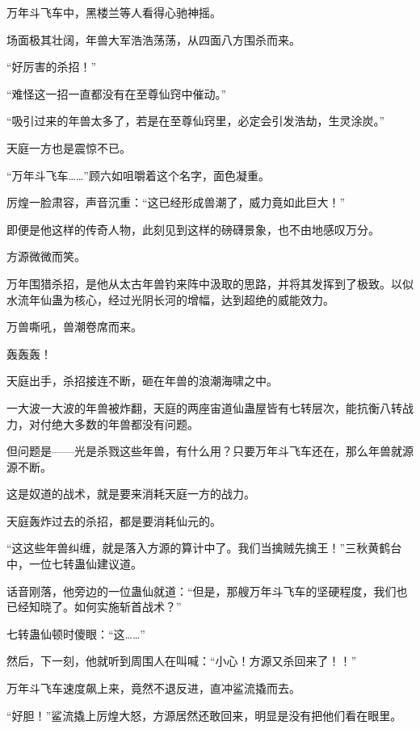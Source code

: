 
\begin{this_body}



万年斗飞车中，黑楼兰等人看得心驰神摇。

场面极其壮阔，年兽大军浩浩荡荡，从四面八方围杀而来。

“好厉害的杀招！”

“难怪这一招一直都没有在至尊仙窍中催动。”

“吸引过来的年兽太多了，若是在至尊仙窍里，必定会引发浩劫，生灵涂炭。”

天庭一方也是震惊不已。

“万年斗飞车……”顾六如咀嚼着这个名字，面色凝重。

厉煌一脸肃容，声音沉重：“这已经形成兽潮了，威力竟如此巨大！”

即便是他这样的传奇人物，此刻见到这样的磅礴景象，也不由地感叹万分。

方源微微而笑。

万年围猎杀招，是他从太古年兽钓来阵中汲取的思路，并将其发挥到了极致。以似水流年仙蛊为核心，经过光阴长河的增幅，达到超绝的威能效力。

万兽嘶吼，兽潮卷席而来。

轰轰轰！

天庭出手，杀招接连不断，砸在年兽的浪潮海啸之中。

一大波一大波的年兽被炸翻，天庭的两座宙道仙蛊屋皆有七转层次，能抗衡八转战力，对付绝大多数的年兽都没有问题。

但问题是——光是杀戮这些年兽，有什么用？只要万年斗飞车还在，那么年兽就源源不断。

这是奴道的战术，就是要来消耗天庭一方的战力。

天庭轰炸过去的杀招，都是要消耗仙元的。

“这这些年兽纠缠，就是落入方源的算计中了。我们当擒贼先擒王！”三秋黄鹤台中，一位七转蛊仙建议道。

话音刚落，他旁边的一位蛊仙就道：“但是，那艘万年斗飞车的坚硬程度，我们也已经知晓了。如何实施斩首战术？”

七转蛊仙顿时傻眼：“这……”

然后，下一刻，他就听到周围人在叫喊：“小心！方源又杀回来了！！”

万年斗飞车速度飙上来，竟然不退反进，直冲鲨流撬而去。

“好胆！”鲨流撬上厉煌大怒，方源居然还敢回来，明显是没有把他们看在眼里。


\end{this_body}
